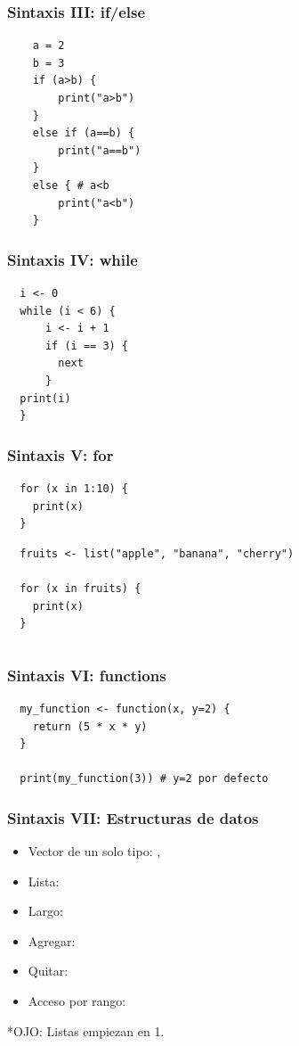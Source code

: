 \documentclass[14pt,aspectratio=169,xcolor=dvipsnames]{beamer}
\begin{document}
\begin{frame}[fragile]\frametitle{Sintaxis III: if/else}
    \begin{verbatim}
    a = 2
    b = 3
    if (a>b) {
        print("a>b")
    }
    else if (a==b) {
        print("a==b")
    }
    else { # a<b
        print("a<b")
    }
    \end{verbatim}
\end{frame}
\begin{frame}[fragile]\frametitle{Sintaxis IV: while}
    \begin{verbatim}
  i <- 0
  while (i < 6) {
      i <- i + 1
      if (i == 3) {
        next
      }
  print(i)
  } 
    \end{verbatim}
\end{frame}
\begin{frame}[fragile]\frametitle{Sintaxis V: for}
    \begin{verbatim}
  for (x in 1:10) {
    print(x)
  } 
    \end{verbatim}
    \begin{verbatim}
  fruits <- list("apple", "banana", "cherry")

  for (x in fruits) {
    print(x)
  } 
    \end{verbatim}
    \begin{verbatim}
    \end{verbatim}
\end{frame}
\begin{frame}[fragile]\frametitle{Sintaxis VI: functions}
    \begin{verbatim}
  my_function <- function(x, y=2) {
    return (5 * x * y)
  }

  print(my_function(3)) # y=2 por defecto
    \end{verbatim}
\end{frame}
\begin{frame}[fragile]\frametitle{Sintaxis VII: Estructuras de datos}
    \begin{itemize}
        \item Vector de un solo tipo: ,
        \item Lista: 
        \item Largo: 
        \item Agregar: 
        \item Quitar: 
        \item Acceso por rango: 
    \end{itemize}

*OJO: Listas empiezan en 1.
\end{frame}
\end{document}
